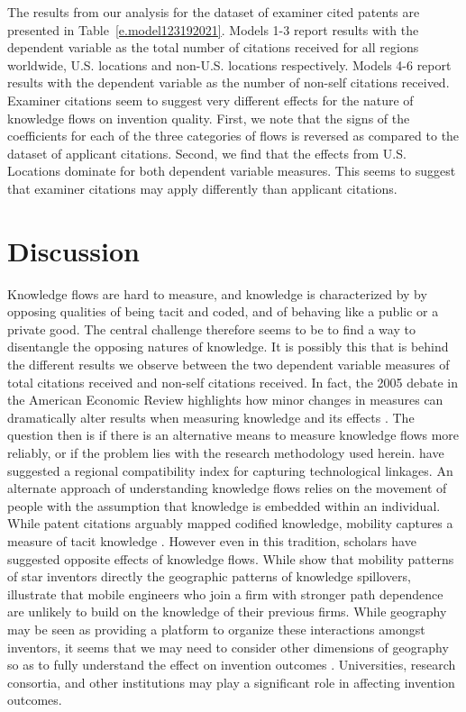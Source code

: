 \documentclass[12pt,letterpaper]{article}
\begin{document}
%


%
%

The results from our analysis for the dataset of examiner cited patents are presented in Table~\ref{e.model123192021}. Models 1-3 report results with the dependent variable as the total number of citations received for all regions worldwide, U.S. locations and non-U.S. locations respectively. Models 4-6 report results with the dependent variable as the number of non-self citations received. Examiner citations seem to suggest very different effects for the nature of knowledge flows on invention quality. First, we note that the signs of the coefficients for each of the three categories of flows is reversed as compared to the dataset of applicant citations. Second, we find that the effects from U.S. Locations dominate for both dependent variable measures. This seems to suggest that examiner citations may apply differently than applicant citations.




\section*{Discussion}
Knowledge flows are hard to measure, and knowledge is characterized by by opposing qualities of being tacit and coded, and of behaving like a public or a private good. The central challenge therefore seems to be to find a way to disentangle the opposing natures of knowledge. It is possibly this that is behind the different results we observe between the two dependent variable measures of total citations received and non-self citations received. In fact, the 2005 debate in the American Economic Review highlights how minor changes in measures can dramatically alter results when measuring knowledge and its effects \citep*{Henderson2005, Thompson2005}. The question then is if there is an alternative means to measure knowledge flows more reliably, or if the problem lies with the research methodology used herein. \cite{Maurseth2002} have suggested a regional compatibility index for capturing technological linkages. An alternate approach of understanding knowledge flows relies on the movement of people with the assumption that knowledge is embedded within an individual. While patent citations arguably mapped codified knowledge, mobility captures a measure of tacit knowledge \citep{Polanyi1958}. However even in this tradition, scholars have suggested opposite effects of knowledge flows. While \cite{Almeida1997} show that mobility patterns of star inventors directly the geographic patterns of knowledge spillovers, \cite{Song2003} illustrate that mobile engineers who join a firm with stronger path dependence are unlikely to build on the knowledge of their previous firms. While geography may be seen as providing a platform to organize these interactions amongst inventors, it seems that we may need to consider other dimensions of geography so as to fully understand the effect on invention outcomes \citep{Bunnell2001}. Universities, research consortia, and other institutions may play a significant role in affecting invention outcomes.
\end{document}
